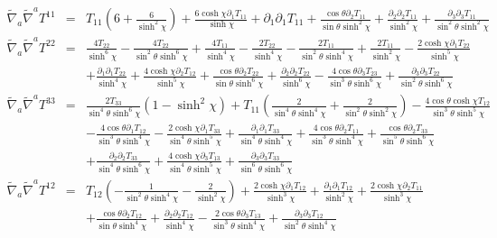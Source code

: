 \documentclass[aps,onecolumn,10pt]{revtex4}
\numberwithin{equation}{section}
\numberwithin{equation}{section}
\begin{document}
\begin{eqnarray}
\tilde{\nabla}_a\tilde{\nabla}^aT^{11}&=& T_{11} \left(6 + \frac{6}{\sinh^2\chi}\right) + \frac{6 \cosh\chi \partial_{1}T_{11}}{\sinh\chi} + \partial_{1}\partial_{1}T_{11} + \frac{\cos\theta \partial_{2}T_{11}}{\sin\theta \sinh^2\chi} + \frac{\partial_{2}\partial_{2}T_{11}}{\sinh^2\chi} + \frac{\partial_{3}\partial_{3}T_{11}}{\sin^2\theta \sinh^2\chi}
 \nonumber\\ 
\tilde{\nabla}_a\tilde{\nabla}^aT^{22}&=& \frac{4 T_{22}}{\sinh^6\chi} -  \frac{4 T_{22}}{\sin^2\theta \sinh^6\chi} + \frac{4 T_{11}}{\sinh^4\chi} -  \frac{2 T_{22}}{\sinh^4\chi} -  \frac{2 T_{11}}{\sin^2\theta \sinh^4\chi} + \frac{2 T_{11}}{\sinh^2\chi} -  \frac{2 \cosh\chi \partial_{1}T_{22}}{\sinh^5\chi} \nonumber \\ 
&& + \frac{\partial_{1}\partial_{1}T_{22}}{\sinh^4\chi} + \frac{4 \cosh\chi \partial_{2}T_{12}}{\sinh^5\chi} + \frac{\cos\theta \partial_{2}T_{22}}{\sin\theta \sinh^6\chi} + \frac{\partial_{2}\partial_{2}T_{22}}{\sinh^6\chi} -  \frac{4 \cos\theta \partial_{3}T_{23}}{\sin^3\theta \sinh^6\chi} + \frac{\partial_{3}\partial_{3}T_{22}}{\sin^2\theta \sinh^6\chi}
 \nonumber\\ 
\tilde{\nabla}_a\tilde{\nabla}^aT^{33}&=& \frac{2T_{33}} {\sin^4\theta\sinh^6\chi}\left(1-{\sinh^2\chi}\right) + T_{11} \left(\frac{2}{\sin^4\theta \sinh^4\chi} + \frac{2}{\sin^2\theta \sinh^2\chi}\right) -  \frac{4 \cos\theta \cosh\chi T_{12}}{\sin^3\theta \sinh^5\chi} \nonumber \\ 
&& -  \frac{4 \cos\theta \partial_{1}T_{12}}{\sin^3\theta \sinh^4\chi} -  \frac{2 \cosh\chi \partial_{1}T_{33}}{\sin^4\theta \sinh^5\chi} + \frac{\partial_{1}\partial_{1}T_{33}}{\sin^4\theta \sinh^4\chi} + \frac{4 \cos\theta \partial_{2}T_{11}}{\sin^3\theta \sinh^4\chi} + \frac{\cos\theta \partial_{2}T_{33}}{\sin^5\theta \sinh^6\chi} \nonumber \\ 
&& + \frac{\partial_{2}\partial_{2}T_{33}}{\sin^4\theta \sinh^6\chi} + \frac{4 \cosh\chi \partial_{3}T_{13}}{\sin^4\theta \sinh^5\chi} + \frac{\partial_{3}\partial_{3}T_{33}}{\sin^6\theta \sinh^6\chi}
\nonumber\\ 
\tilde{\nabla}_a\tilde{\nabla}^aT^{12}&=& T_{12} \left(- \frac{1}{\sin^2\theta \sinh^4\chi} -  \frac{2}{\sinh^2\chi}\right) + \frac{2 \cosh\chi \partial_{1}T_{12}}{\sinh^3\chi} + \frac{\partial_{1}\partial_{1}T_{12}}{\sinh^2\chi} + \frac{2 \cosh\chi \partial_{2}T_{11}}{\sinh^3\chi} \nonumber \\ 
&& + \frac{\cos\theta \partial_{2}T_{12}}{\sin\theta \sinh^4\chi} + \frac{\partial_{2}\partial_{2}T_{12}}{\sinh^4\chi} -  \frac{2 \cos\theta \partial_{3}T_{13}}{\sin^3\theta \sinh^4\chi} + \frac{\partial_{3}\partial_{3}T_{12}}{\sin^2\theta \sinh^4\chi}

\end{eqnarray}
\end{document}
